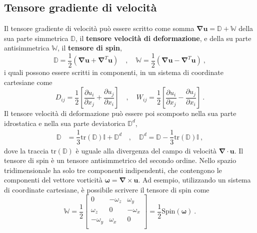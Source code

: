 \subsection{Tensore gradiente di velocità}
 Il tensore gradiente di velocità può essere scritto come somma $\bm{\nabla}\bm{u} = \mathbb{D} + \mathbb{W}$ della sua parte simmetrica $\mathbb{D}$, il \textbf{tensore velocità di deformazione}, e della su parte antisimmetrica $\mathbb{W}$, il \textbf{tensore di spin},
 \begin{equation}
  \mathbb{D} = \dfrac{1}{2}\left(\bm{\nabla} \bm{u} + \bm{\nabla}^T \bm{u}\right)
  \quad , \quad 
  \mathbb{W} = \dfrac{1}{2}\left(\bm{\nabla} \bm{u} - \bm{\nabla}^T \bm{u}\right) \ ,
 \end{equation}
 i quali possono essere scritti in componenti, in un sistema di coordinate cartesiane come 
 \begin{equation}
  D_{ij} = \dfrac{1}{2}\left[ \dfrac{\partial u_i}{\partial x_j} + \dfrac{\partial u_j}{\partial x_i} \right] \quad , \quad 
  W_{ij} = \dfrac{1}{2}\left[ \dfrac{\partial u_i}{\partial x_j} - \dfrac{\partial u_j}{\partial x_i} \right] \ .
 \end{equation}
 Il tensore velocità di deformazione può essere poi scomposto nella sua parte idrostatica e nella sua parte deviatorica $\mathbb{D}^d$,
 \begin{equation}
 \begin{aligned}
  \mathbb{D} & = \dfrac{1}{3} \text{tr}(\mathbb{D}) \mathbb{I} + \mathbb{D}^d \quad , \quad
   \mathbb{D}^d = \mathbb{D} - \dfrac{1}{3} \text{tr}(\mathbb{D}) \mathbb{I} \ ,
 \end{aligned}
 \end{equation}
 dove la traccia $\text{tr}(\mathbb{D})$ è uguale alla divergenza del campo di velocità $\bm{\nabla} \cdot \bm{u}$.
 \newline
 Il tensore di spin è un tensore antisimmetrico del secondo ordine. Nello spazio tridimensionale ha solo tre componenti indipendenti, che contengono le componenti del vettore vorticità $\bm{\omega} = \bm{\nabla} \times \bm{u}$. Ad esempio, utilizzando un sistema di coordinate cartesiane, è possibile scrivere il tensore di spin come
 \begin{equation}
  \mathbb{W} = \dfrac{1}{2}\begin{bmatrix}
   0 & -\omega_z & \omega_y \\
   \omega_z & 0 & -\omega_x \\
   -\omega_y & \omega_x & 0 \\   
  \end{bmatrix} = \dfrac{1}{2}\text{Spin}(\bm{\omega}) \ .
 \end{equation}
